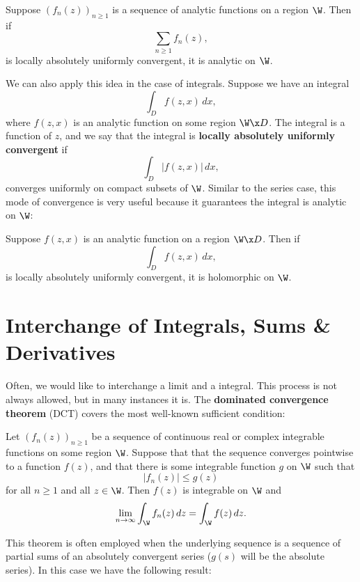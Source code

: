     \begin{theorem}
      Suppose $(f_{n}(z))_{n \ge 1}$ is a sequence of analytic functions on a region $\W$. Then if
      \[
        \sum_{n \ge 1}f_{n}(z),
      \]
      is locally absolutely uniformly convergent, it is analytic on $\W$.
    \end{theorem}

    We can also apply this idea in the case of integrals. Suppose we have an integral
    \[
      \int_{D}f(z,x)\,dx,
    \]
    where $f(z,x)$ is an analytic function on some region $\W \x D$. The integral is a function of $z$, and we say that the integral is \textbf{locally absolutely uniformly convergent} if
    \[
      \int_{D}|f(z,x)|\,dx,
    \]
    converges uniformly on compact subsets of $\W$. Similar to the series case, this mode of convergence is very useful because it guarantees the integral is analytic on $\W$:

    \begin{theorem}\label{thm:analytic_integral}
      Suppose $f(z,x)$ is an analytic function on a region $\W \x D$. Then if
      \[
        \int_{D}f(z,x)\,dx,
      \]
      is locally absolutely uniformly convergent, it is holomorphic on $\W$.
    \end{theorem}
  \section{Interchange of Integrals, Sums \& Derivatives}
    Often, we would like to interchange a limit and a integral. This process is not always allowed, but in many instances it is. The \textbf{dominated convergence theorem} (DCT) covers the most well-known sufficient condition:

    \begin{theorem}
      Let $(f_{n}(z))_{n \ge 1}$ be a sequence of continuous real or complex integrable functions on some region $\W$. Suppose that that the sequence converges pointwise to a function $f(z)$, and that there is some integrable function $g$ on $\W$ such that
      \[
        |f_{n}(z)| \le g(z)
      \]
      for all $n \ge 1$ and all $z \in \W$. Then $f(z)$ is integrable on $\W$ and
      \[
        \lim_{n \to \infty}\int_{\W}f_{n}(z)\,dz = \int_{\W}f(z)\,dz.
      \]
    \end{theorem}

    This theorem is often employed when the underlying sequence is a sequence of partial sums of an absolutely convergent series ($g(s)$ will be the absolute series). In this case we have the following result:

